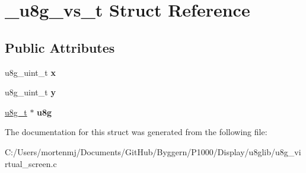 \hypertarget{struct__u8g__vs__t}{\section{\-\_\-u8g\-\_\-vs\-\_\-t Struct Reference}
\label{struct__u8g__vs__t}
}
\subsection*{Public Attributes}
\begin{DoxyCompactItemize}
\item 
\hypertarget{struct__u8g__vs__t_aabf59e938c85510ec3dcac768bd865b4}{u8g\-\_\-uint\-\_\-t {\bfseries x}}\label{struct__u8g__vs__t_aabf59e938c85510ec3dcac768bd865b4}

\item 
\hypertarget{struct__u8g__vs__t_af4bb04fe39f2f4c2d53ed8fcc82d0036}{u8g\-\_\-uint\-\_\-t {\bfseries y}}\label{struct__u8g__vs__t_af4bb04fe39f2f4c2d53ed8fcc82d0036}

\item 
\hypertarget{struct__u8g__vs__t_ad7346a6451b8b19a60d5f5a843bc854d}{\hyperlink{struct__u8g__t}{u8g\-\_\-t} $\ast$ {\bfseries u8g}}\label{struct__u8g__vs__t_ad7346a6451b8b19a60d5f5a843bc854d}

\end{DoxyCompactItemize}


The documentation for this struct was generated from the following file\-:\begin{DoxyCompactItemize}
\item 
C\-:/\-Users/mortenmj/\-Documents/\-Git\-Hub/\-Byggern/\-P1000/\-Display/u8glib/u8g\-\_\-virtual\-\_\-screen.\-c\end{DoxyCompactItemize}

